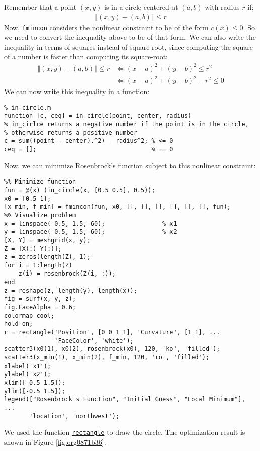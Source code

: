 \documentclass[12pt, a4paper]{article}
\begin{document}
Remember that a point \((x,y)\) is in a circle centered at \((a,b)\) with radius \(r\) if:
\begin{align*}
\left\Vert (x,y) - (a,b) \right\Vert \leq r
\end{align*}
Now, \texttt{fmincon} considers the nonlinear constraint to be of the form \(c(x)\leq 0\).
So we need to convert the inequality above to be of that form.
We can also write the inequality in terms of squares instead of square-root, since computing the square of a number is faster than computing its square-root:
\begin{align*}
\left\Vert (x,y) - (a,b) \right\Vert \leq r
&\iff (x-a)^2 + (y-b)^2 \leq r^2\\
&\iff (x-a)^2 + (y-b)^2 - r^2 \leq 0
\end{align*}
We can now write this inequality in a function:
\lstset{language=matlab,label= ,caption= ,captionpos=b,firstnumber=1,numbers=left,style=Matlab-editor}
\begin{lstlisting}
% in_circle.m
function [c, ceq] = in_circle(point, center, radius)
% in_cirlce returns a negative number if the point is in the circle,
% otherwise returns a positive number
c = sum((point - center).^2) - radius^2; % <= 0
ceq = [];                                % == 0
\end{lstlisting}

Now, we can minimize Rosenbrock's function subject to this nonlinear constraint:
\lstset{language=matlab,label= ,caption= ,captionpos=b,firstnumber=1,numbers=left,style=Matlab-editor}
\begin{lstlisting}
%% Minimize function
fun = @(x) (in_circle(x, [0.5 0.5], 0.5));
x0 = [0.5 1];
[x_min, f_min] = fmincon(fun, x0, [], [], [], [], [], [], fun);
%% Visualize problem
x = linspace(-0.5, 1.5, 60);                % x1
y = linspace(-0.5, 1.5, 60);                % x2
[X, Y] = meshgrid(x, y);
Z = [X(:) Y(:)];
z = zeros(length(Z), 1);
for i = 1:length(Z)
    z(i) = rosenbrock(Z(i, :));
end
z = reshape(z, length(y), length(x));
fig = surf(x, y, z);
fig.FaceAlpha = 0.6;
colormap cool;
hold on;
r = rectangle('Position', [0 0 1 1], 'Curvature', [1 1], ...
              'FaceColor', 'white');
scatter3(x0(1), x0(2), rosenbrock(x0), 120, 'ko', 'filled');
scatter3(x_min(1), x_min(2), f_min, 120, 'ro', 'filled');
xlabel('x1');
ylabel('x2');
xlim([-0.5 1.5]);
ylim([-0.5 1.5]);
legend(["Rosenbrock's Function", "Initial Guess", "Local Minimum"], ...
       'location', 'northwest');
\end{lstlisting}
We used the function \href{https://www.mathworks.com/help/matlab/ref/rectangle.html}{\texttt{rectangle}} to draw the circle.
The optimization result is shown in Figure \ref{fig:org0871b36}.
\end{document}
